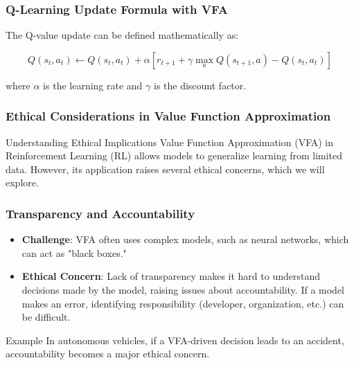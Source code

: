 \documentclass[aspectratio=169]{beamer}
\begin{document}
\begin{frame}[fragile]
    \frametitle{Q-Learning Update Formula with VFA}
    The Q-value update can be defined mathematically as:

    \begin{equation}
        Q(s_t, a_t) \gets Q(s_t, a_t) + \alpha \left[ r_{t+1} + \gamma \max_{a} Q(s_{t+1}, a) - Q(s_t, a_t) \right]
    \end{equation}

    where $\alpha$ is the learning rate and $\gamma$ is the discount factor.
\end{frame}

\begin{frame}[fragile]
    \frametitle{Ethical Considerations in Value Function Approximation}
    \begin{block}{Understanding Ethical Implications}
        Value Function Approximation (VFA) in Reinforcement Learning (RL) allows models to generalize learning from limited data. However, its application raises several ethical concerns, which we will explore.
    \end{block}
\end{frame}

\begin{frame}[fragile]
    \frametitle{Transparency and Accountability}
    \begin{itemize}
        \item \textbf{Challenge}: VFA often uses complex models, such as neural networks, which can act as "black boxes."
        \item \textbf{Ethical Concern}: Lack of transparency makes it hard to understand decisions made by the model, raising issues about accountability. If a model makes an error, identifying responsibility (developer, organization, etc.) can be difficult.
    \end{itemize}
    \begin{block}{Example}
        In autonomous vehicles, if a VFA-driven decision leads to an accident, accountability becomes a major ethical concern.
    \end{block}
\end{frame}
\end{document}
